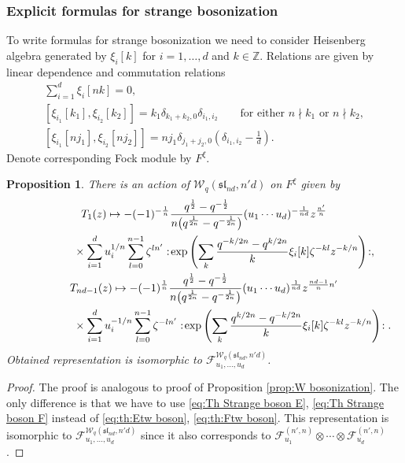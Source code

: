 \documentclass[pdftex]{sigma}
\numberwithin{equation}{section}
\newtheorem{Proposition}[Theorem]{Proposition}
\theoremstyle{definition}
\newcommand{\half}{\frac{1}{2}}
\newcommand{\dWFock}{\mathcal{F}^{\mathcal{W}_{q} ( \mathfrak{sl}_{nd}, n'd )}_{u_1, \dots, u_d}}
\begin{document}
\subsubsection{Explicit formulas for strange bosonization}
To write formulas for strange bosonization we need to consider Heisenberg algebra generated by $\xi_i[k]$ for $i=1, \dots, d$ and $k \in \mathbb{Z}$. Relations are given by linear dependence and commutation relations
\begin{gather*}
\sum_{i=1}^{d} \xi_{i}[nk] =0,\\
[\xi_{i_1}[k_1], \xi_{i_2}[k_2] ] = k_1 \delta_{k_1+k_2,0} \delta_{i_1, i_2} \qquad \text{for either $n \nmid k_1$ or $n \nmid k_2$}, \\
[\xi_{i_1}[nj_1], \xi_{i_2}[nj_2] ] = nj_1 \delta_{j_1+j_2,0} \left( \delta_{i_1, i_2}-\frac{1}{d} \right).
\end{gather*}
Denote corresponding Fock module by $F^{\xi}$.
\begin{Proposition}
There is an action of $\mathcal{W}_q (\mathfrak{sl}_{nd}, n'd)$ on $F^{\xi}$ given by
\begin{gather*}
T_1 (z) \mapsto -(-1)^{-\frac{1}{n}} \frac{ q^{\half}-q^{-\half} }{n\big(q^{\frac{1}{2n}}-q^{-\frac{1}{2n}}\big)} (u_1 \cdots u_d)^{-\frac{1}{nd}} z^{\frac{n'}{n}} \\
\hphantom{T_1 (z) \mapsto}{}\times \sum_{i=1}^d u_i^{1/n} \sum_{l=0}^{n-1} \zeta^{l n'} : \! \exp \left( \sum_{k} \frac{q^{-k/2n}-q^{k/2n}}{k} \xi_{i}[k] \zeta^{-kl} z^{-k/n} \right) \! :,\\
T_{nd-1}(z) \mapsto -(-1)^{\frac{1}{n}} \frac{q^{\half}-q^{-\half}}{n\big(q^{\frac{1}{2n}}-q^{-\frac{1}{2n}}\big)} (u_1 \cdots u_d)^{\frac{1}{nd}} z^{\frac{nd-1}{n}n'} \\
\hphantom{T_{nd-1}(z) \mapsto}{}\times \sum_{i=1}^{d} u_i^{-1/n} \sum_{l=0}^{n-1} \zeta^{-l n'} : \! \exp \left( \sum_{ k}\frac{q^{k/2n}-q^{-k/2n}}{k} \xi_{i}[k] \zeta^{-kl} z^{-k/n} \right) \! :.
\end{gather*}
Obtained representation is isomorphic to $\dWFock$.
\end{Proposition}
\begin{proof}
The proof is analogous to proof of Proposition \ref{prop:W bosonization}. The only difference is that we have to use \eqref{eq:Th Strange boson E}, \eqref{eq:Th Strange boson F} instead of \eqref{eq:th:Etw boson}, \eqref{eq:th:Ftw boson}.
This representation is isomorphic to $\dWFock$ since it also corresponds to $\mathcal{F}^{(n',n)}_{u_1} \otimes \cdots \otimes \mathcal{F}_{u_d}^{(n',n)}$.
\end{proof}
\end{document}
